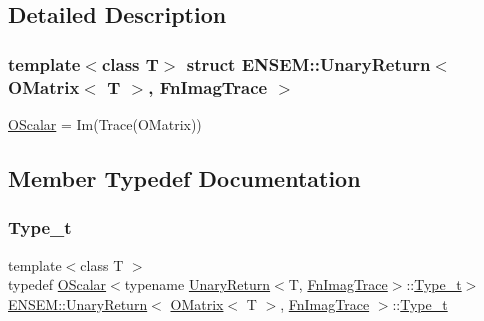 \subsection{Detailed Description}
\subsubsection*{template$<$class T$>$\newline
struct E\+N\+S\+E\+M\+::\+Unary\+Return$<$ O\+Matrix$<$ T $>$, Fn\+Imag\+Trace $>$}

\mbox{\hyperlink{classENSEM_1_1OScalar}{O\+Scalar}} = Im(\+Trace(\+O\+Matrix)) 

\subsection{Member Typedef Documentation}
\mbox{\label{structENSEM_1_1UnaryReturn_3_01OMatrix_3_01T_01_4_00_01FnImagTrace_01_4_a7b4a608d50b5637e2ca0d51ba6ff692b}} 
\subsubsection{\texorpdfstring{Type\_t}{Type\_t}\hspace{0.1cm}{\footnotesize\ttfamily [1/3]}}
{\footnotesize\ttfamily template$<$class T $>$ \\
typedef \mbox{\hyperlink{classENSEM_1_1OScalar}{O\+Scalar}}$<$typename \mbox{\hyperlink{structENSEM_1_1UnaryReturn}{Unary\+Return}}$<$T, \mbox{\hyperlink{structENSEM_1_1FnImagTrace}{Fn\+Imag\+Trace}}$>$\+::\mbox{\hyperlink{structENSEM_1_1UnaryReturn_3_01OMatrix_3_01T_01_4_00_01FnImagTrace_01_4_a7b4a608d50b5637e2ca0d51ba6ff692b}{Type\+\_\+t}}$>$ \mbox{\hyperlink{structENSEM_1_1UnaryReturn}{E\+N\+S\+E\+M\+::\+Unary\+Return}}$<$ \mbox{\hyperlink{classENSEM_1_1OMatrix}{O\+Matrix}}$<$ T $>$, \mbox{\hyperlink{structENSEM_1_1FnImagTrace}{Fn\+Imag\+Trace}} $>$\+::\mbox{\hyperlink{structENSEM_1_1UnaryReturn_3_01OMatrix_3_01T_01_4_00_01FnImagTrace_01_4_a7b4a608d50b5637e2ca0d51ba6ff692b}{Type\+\_\+t}}}

\mbox{\label{structENSEM_1_1UnaryReturn_3_01OMatrix_3_01T_01_4_00_01FnImagTrace_01_4_a7b4a608d50b5637e2ca0d51ba6ff692b}} 
